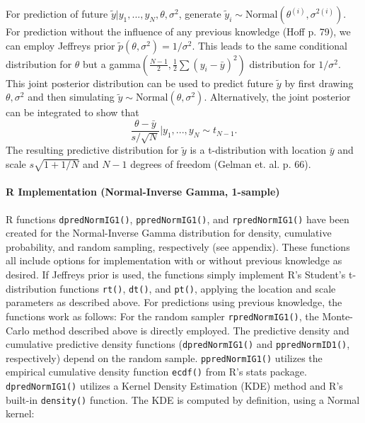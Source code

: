 \documentclass[12pt, a4paper]{article}
\begin{document}
\noindent For prediction of future $\tilde{y}|y_1,...,y_N,\theta,\sigma^2$, generate $\tilde{y}_i \sim \text{Normal}\left(\theta^{(i)},\sigma^{2(i)}\right)$.\\

\noindent For prediction without the influence of any previous knowledge (Hoff p. 79), we can employ Jeffreys prior $\tilde{p}\left(\theta,\sigma^2\right) = 1/\sigma^2$.  This leads to the same conditional distribution for $\theta$ but a gamma$\left(\frac{N-1}{2},\frac{1}{2}\sum\left(y_i - \bar{y}\right)^2\right)$ distribution for $1/\sigma^2$.  This joint posterior distribution can be used to predict future $\tilde{y}$ by first drawing $\theta,\sigma^2$ and then simulating $\tilde{y}\sim\text{Normal}\left(\theta,\sigma^2\right)$.   Alternatively, the joint posterior can be integrated to show that
        $$\dfrac{\theta-\bar{y}}{s/\sqrt{N}}|y_1,...,y_N\sim t_{N-1}.$$
\noindent The resulting predictive distribution for $\tilde{y}$ is a t-distribution with location $\bar{y}$ and scale $s\sqrt{1+1/N}$ and $N-1$ degrees of freedom (Gelman et. al. p. 66).


      \paragraph{R Implementation (Normal-Inverse Gamma, 1-sample)}
      R functions \texttt{dpredNormIG1()}, \texttt{ppredNormIG1()}, and \texttt{rpredNormIG1()} have been created for the Normal-Inverse Gamma distribution for density, cumulative probability, and random sampling, respectively (see appendix).  These functions all include options for implementation with or without previous knowledge as desired.  If Jeffreys prior is used, the functions simply implement R's Student's t-distribution functions \texttt{rt()}, \texttt{dt()}, and \texttt{pt()}, applying the location and scale parameters as described above.  For predictions using previous knowledge, the functions work as follows:  For the random sampler \texttt{rpredNormIG1()}, the Monte-Carlo method described above is directly employed.  The predictive density and cumulative predictive density functions (\texttt{dpredNormIG1()} and \texttt{ppredNormID1()}, respectively) depend on the random sample.  \texttt{ppredNormIG1()} utilizes the empirical cumulative density function \texttt{ecdf()} from R's stats package.  \texttt{dpredNormIG1()} utilizes a Kernel Density Estimation (KDE) method and R's built-in \texttt{density()} function.  The KDE is computed by definition, using a Normal kernel:
\end{document}

